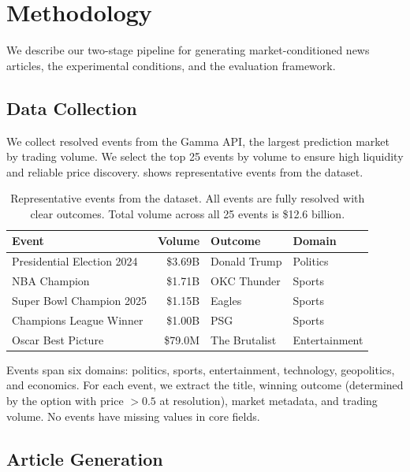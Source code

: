 \section{Methodology}
\label{sec:method}

We describe our two-stage pipeline for generating market-conditioned news articles, the experimental conditions, and the evaluation framework.

\subsection{Data Collection}
\label{sec:data}

We collect resolved events from the \polymarket Gamma API, the largest prediction market by trading volume. We select the top 25 events by volume to ensure high liquidity and reliable price discovery.  shows representative events from the dataset.

\begin{table}[t]
\centering
\caption{Representative events from the \polymarket dataset. All events are fully resolved with clear outcomes. Total volume across all 25 events is \$12.6 billion.}
\label{tab:events}
\small
\begin{tabular}{@{}lrll@{}}
\toprule
\textbf{Event} & \textbf{Volume} & \textbf{Outcome} & \textbf{Domain} \\
\midrule
Presidential Election 2024 & \$3.69B & Donald Trump & Politics \\
NBA Champion & \$1.71B & OKC Thunder & Sports \\
Super Bowl Champion 2025 & \$1.15B & Eagles & Sports \\
Champions League Winner & \$1.00B & PSG & Sports \\
Oscar Best Picture & \$79.0M & The Brutalist & Entertainment \\
\bottomrule
\end{tabular}
\end{table}

Events span six domains: politics, sports, entertainment, technology, geopolitics, and economics. For each event, we extract the title, winning outcome (determined by the option with price $> 0.5$ at resolution), market metadata, and trading volume. No events have missing values in core fields.

\subsection{Article Generation}
\label{sec:generation}

